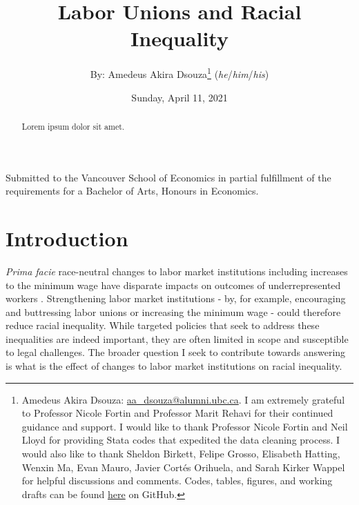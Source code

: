 \documentclass[11pt]{article}
\title{Labor Unions and Racial Inequality}
\author{By: Amedeus Akira Dsouza\thanks{Amedeus Akira Dsouza: \href{mailto:aa_dsouza@alumni.ubc.ca}{aa\_dsouza@alumni.ubc.ca}. I am extremely grateful to Professor Nicole Fortin and Professor Marit Rehavi for their continued guidance and support. I would like to thank Professor Nicole Fortin and Neil Lloyd for providing Stata codes that expedited the data cleaning process. I would also like to thank Sheldon Birkett, Felipe Grosso, Elisabeth Hatting, Wenxin Ma, Evan Mauro, Javier Cort\'{e}s Orihuela, and Sarah Kirker Wappel for helpful discussions and comments. Codes, tables, figures, and working drafts can be found \href{https://github.com/aadsouza/econ499}{here} on GitHub.} \textsc{ (}\textit{he}\textsc{/}\textit{him}\textsc{/}\textit{his}\textsc{)}}
\affil{University of British Columbia}
\affil{Supervised by: Nicole Fortin and M. Marit Rehavi}
\date{Sunday, April 11, 2021}
\begin{document}
\begin{titlepage}
\maketitle
\centering
\vspace{2cm}
Submitted to the Vancouver School of Economics in partial fulfillment of the requirements for a Bachelor of Arts, Honours in Economics.
\end{titlepage}
\thispagestyle{empty}
\doublespacing
\begin{abstract}
Lorem ipsum dolor sit amet.
\end{abstract}
\clearpage
{}
\section{Introduction}\label{sec:intro}
\textit{Prima facie} race-neutral changes to labor market institutions including increases to the minimum wage have disparate impacts on outcomes of underrepresented workers \citep[see, for example,][]{derenoncourtmontialoux2020}. Strengthening labor market institutions - by, for example, encouraging and buttressing labor unions or increasing the minimum wage - could therefore reduce racial inequality. While targeted policies that seek to address these inequalities are indeed important, they are often limited in scope and susceptible to legal challenges. The broader question I seek to contribute towards answering is what is the effect of changes to labor market institutions on racial inequality. 
\end{document}
